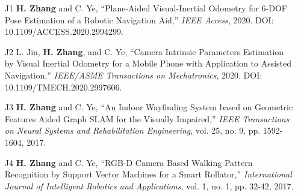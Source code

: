 

\begin{justify}
	\begin{itemize}[before=\fontsize{9pt}{1em}\bodyfontlight\upshape\color{text},leftmargin=3ex, nosep, noitemsep]
		\setlength{\parskip}{0pt}
		\renewcommand{\labelitemi}{\bullet}
		\item[J1]{\textbf{H. Zhang} and C. Ye, “Plane-Aided Visual-Inertial Odometry for 6-DOF Pose Estimation of a Robotic Navigation Aid,” \emph{IEEE Access}, 2020. DOI: 10.1109/ACCESS.2020.2994299.}
		\item[J2]{L. Jin, \textbf{H. Zhang}, and C. Ye, “Camera Intrinsic Parameters Estimation by Visual Inertial Odometry for a Mobile Phone with Application to Assisted Navigation,” \emph{IEEE/ASME Transactions on Mechatronics}, 2020. DOI: 10.1109/TMECH.2020.2997606.}
		\item[J3]{\textbf{H. Zhang} and C. Ye, “An Indoor Wayfinding System based on Geometric Features Aided Graph SLAM for the Visually Impaired,” \emph{IEEE Transactions on Neural Systems and Rehabilitation Engineering}, vol. 25, no. 9, pp. 1592-1604, 2017.}
		\item[J4]{\textbf{H. Zhang} and C. Ye, “RGB-D Camera Based Walking Pattern Recognition by Support Vector Machines for a Smart Rollator,” \emph{International Journal of Intelligent Robotics and Applications}, vol. 1, no. 1, pp. 32-42, 2017.}
	\end{itemize}
\end{justify}


